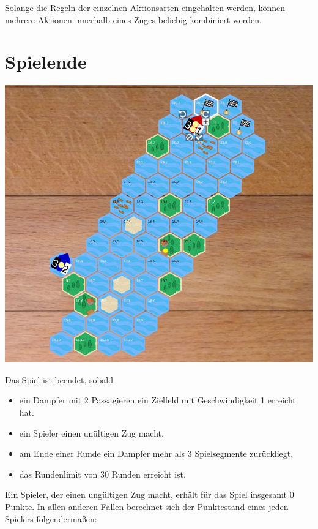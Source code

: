 \documentclass[12pt,a4paper, ngerman, oneside]{scrartcl}
\begin{document}
Solange die Regeln der einzelnen Aktionsarten eingehalten werden, können mehrere
Aktionen innerhalb eines Zuges beliebig kombiniert werden.

\section{Spielende}\label{sec:spielende}

\begin{centering}
  \includegraphics[width=\textwidth]{bilder/spielfeld-ziel.jpg}
\end{centering}

Das Spiel ist beendet, sobald

\begin{itemize}
\item ein Dampfer mit 2 Passagieren ein Zielfeld mit Geschwindigkeit 1 erreicht hat.
\item ein Spieler einen unültigen Zug macht.
\item am Ende einer Runde ein Dampfer mehr als 3 Spielsegmente zurückliegt.
  \item das Rundenlimit von 30 Runden erreicht ist.
\end{itemize}

Ein Spieler, der einen ungültigen Zug macht, erhält für das Spiel insgesamt 0
Punkte. In allen anderen Fällen berechnet sich der Punktestand eines jeden
Spielers folgendermaßen:
\end{document}
